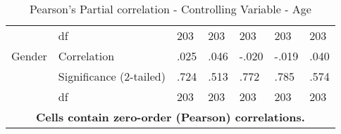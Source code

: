 \documentclass{llncs}
\begin{document}
\begin{table}[!ht]
\begin{tabular}{lllllll}
                  & df                      & 203   & 203     & 203   & 203   & 203     \\
Gender            & Correlation             & .025  & .046    & -.020 & -.019 & .040    \\
                  & Significance (2-tailed) & .724  & .513    & .772  & .785  & .574    \\
                  & df                      & 203   & 203     & 203   & 203   & 203     \\
\multicolumn{7}{c}{\textbf{Cells contain zero-order (Pearson) correlations.}}           \\ \hline
\end{tabular}
\caption{Pearson's Partial correlation - Controlling Variable - Age }
\label{tbl: PearControllingGender}
\end{table}
\end{document}
